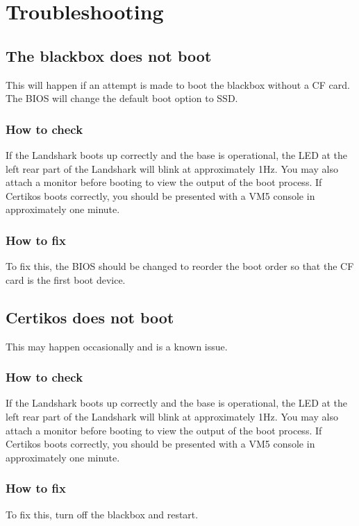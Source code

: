\section{Troubleshooting}

\subsection{The blackbox does not boot}
This will happen if an attempt is made to boot the blackbox without a CF card. The BIOS will
change the default boot option to SSD. 

\subsubsection{How to check}
If the Landshark boots up correctly and the base is operational, the LED at the left rear part
of the Landshark will blink at approximately 1Hz. You may also attach a monitor before booting
to view the output of the boot process. If Certikos boots correctly, you should be presented
with a VM5 console in approximately one minute. 

\subsubsection{How to fix}
To fix this, the BIOS should be changed to reorder the
boot order so that the CF card is the first boot device.

\subsection{Certikos does not boot}
This may happen occasionally and is a known issue. 

\subsubsection{How to check}
If the Landshark boots up correctly and the base is operational, the LED at the left rear part
of the Landshark will blink at approximately 1Hz. You may also attach a monitor before booting
to view the output of the boot process. If Certikos boots correctly, you should be presented
with a VM5 console in approximately one minute. 

\subsubsection{How to fix}
To fix this, turn off the blackbox and restart.

